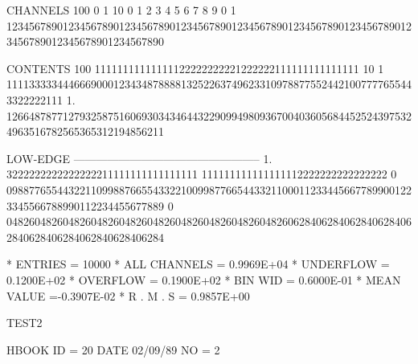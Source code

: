 \begin{Fighere}
\begin{minipage}[t]{.525\textwidth}
\begin{XMPfrac}{3.2}
CHANNELS 100   0                                                                                                  1
          10   0        1         2         3         4         5         6         7         8         9         0
           1   1234567890123456789012345678901234567890123456789012345678901234567890123456789012345678901234567890
 
CONTENTS 100                             11111111111111122222222221222222111111111111111
          10           1 1111333334446669000123434878888132522637496233109788775524421007777655443322222111
           1.  1266487877127932587516069303434644322909949809367004036056844525243975324963516782565365312194856211
 
LOW-EDGE       --------------------------------------------------
           1.  3222222222222222211111111111111111                                 111111111111111112222222222222222
           0   0988776554432211099887665543322100998776654433211000112334456677899001223345566788990112234455677889
           0   0482604826048260482604826048260482604826048260482606284062840628406284062840628406284062840628406284
 
* ENTRIES =      10000      * ALL CHANNELS = 0.9969E+04      * UNDERFLOW = 0.1200E+02      * OVERFLOW = 0.1900E+02
* BIN WID = 0.6000E-01      * MEAN VALUE   =-0.3907E-02      * R . M . S = 0.9857E+00
\end{XMPfrac}
\end{minipage}\hfill
\begin{minipage}[t]{.465\textwidth}
\begin{XMPfont}{6}
TEST2
 
HBOOK     ID = 20        DATE  02/09/89          NO =  2
 

\end{XMPfont}
\end{minipage}
\end{Fighere}
